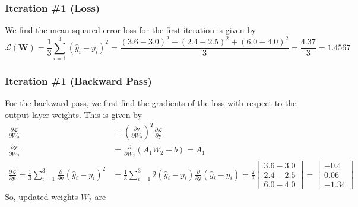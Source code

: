 \documentclass[12pt]{article}
\begin{document}
    \subsubsection*{Iteration \#1 (Loss)}
    We find the mean squared error loss for the first iteration is given by
    \begin{equation}
        \mathcal{L}(\mathbf{W}) = \frac{1}{3} \sum_{i=1}^{3} (\hat{y}_{i} - y_{i})^{2} = \frac{(3.6 - 3.0)^{2} + (2.4 - 2.5)^{2} + (6.0 - 4.0)^{2}}{3} = \frac{4.37}{3} = 1.4567
    \end{equation}

    \subsubsection*{Iteration \#1 (Backward Pass)}
    For the backward pass, we first find the gradients of the loss with respect to the output layer weights. This is given by
    \begin{align*}
        \frac{\partial \mathcal{L}}{\partial W_{2}} &= \left( \frac{\partial \mathbf{y}}{\partial W_{2}} \right)^{T} \frac{\partial \mathcal{L}}{\partial \mathbf{y}} \\
        \frac{\partial \mathbf{y}}{\partial W_{2}} &= \frac{\partial}{\partial W_{2}} (A_{1} W_{2} + b) = A_{1} \\
        \frac{\partial \mathcal{L}}{\partial \mathbf{y}} = \frac{1}{3} \sum_{i=1}^{3} \frac{\partial}{\partial \mathbf{y}} (\hat{y}_{i} - y_{i})^{2}
        &= \frac{1}{3} \sum_{i=1}^{3} 2 (\hat{y}_{i} - y_{i}) \frac{\partial}{\partial \mathbf{y}} (\hat{y}_{i} - y_{i}) = \frac{2}{3} \begin{bmatrix}
            3.6 - 3.0 \\ 2.4 - 2.5 \\ 6.0 - 4.0
        \end{bmatrix} = \begin{bmatrix}
            -0.4 \\ 0.06 \\ -1.34
        \end{bmatrix}
    \end{align*}
    So, updated weights $W_{2}$ are
\end{document}
